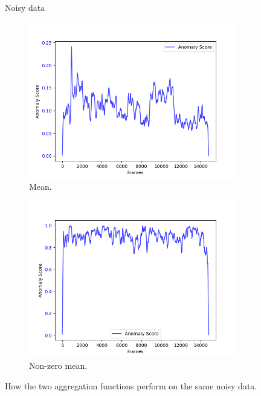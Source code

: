 \begin{figure}[H]
    \centering
    Noisy data
    \begin{subfigure}[t]{0.5\textwidth}
        \centering
        \includegraphics[width=\textwidth]{resources/methodology/aggr_noisy_mean.png}
        \caption{Mean.}
    \end{subfigure}%
    \begin{subfigure}[t]{0.5\textwidth}
        \centering
        \includegraphics[width=\textwidth]{resources/methodology/aggr_noisy_nzmean.png}
        \caption{Non-zero mean.}
    \end{subfigure}
    \caption[Aggregation Functions on Noise Data]{How the two aggregation functions perform on the same noisy data.}
    \label{fig:aggr_noisy}
\end{figure}
